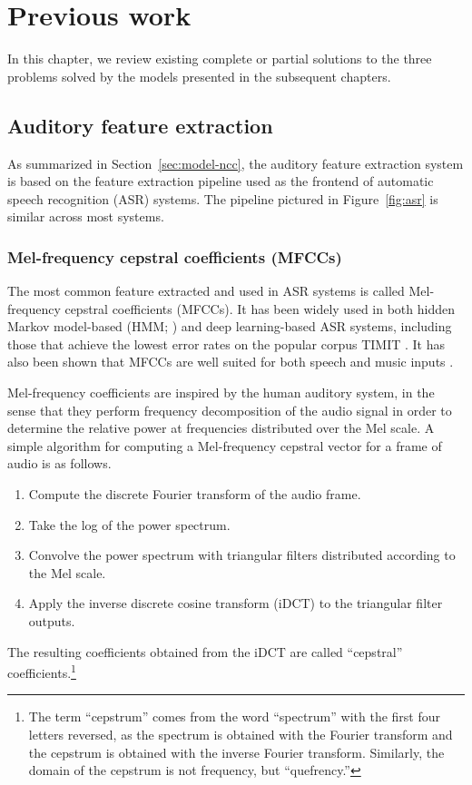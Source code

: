 \chapter{Previous work}
\label{chapt:previouswork}

In this chapter, we review
existing complete or partial solutions
to the three problems
solved by the models
presented in the subsequent chapters.

\section{Auditory feature extraction}

As summarized in Section~\ref{sec:model-ncc},
the auditory feature extraction system
is based on the feature extraction pipeline
used as the frontend
of automatic speech recognition (ASR) systems.
The pipeline pictured in Figure~\ref{fig:asr}
is similar across most systems.

\subsection{Mel-frequency cepstral coefficients (MFCCs)}
\label{sec:prev-mfcc}

The most common feature extracted
and used in ASR systems
is called Mel-frequency cepstral coefficients (MFCCs).
It has been widely used
in both hidden Markov model-based
(HMM; \citealp{hain1999,gales2008,gaikwad2010,alam2013})
and deep learning-based
\citep{graves2006,graves2008,fernandez2008} ASR systems,
including those that achieve
the lowest error rates
on the popular corpus TIMIT
\citep{garofolo1993,lopes2011}.
It has also been shown that
MFCCs are well suited
for both speech and music inputs
\citep{logan2000}.

Mel-frequency coefficients are inspired
by the human auditory system,
in the sense that they perform
frequency decomposition
of the audio signal
in order to determine the relative power
at frequencies distributed over the Mel scale.
A simple algorithm for computing a
Mel-frequency cepstral vector
for a frame of audio is as follows.

\begin{enumerate}
  \item Compute the discrete Fourier transform
    of the audio frame.
  \item Take the log of the power spectrum.
  \item Convolve the power spectrum
    with triangular filters distributed
    according to the Mel scale.
  \item Apply the inverse discrete cosine transform (iDCT)
    to the triangular filter outputs.
\end{enumerate}
The resulting coefficients obtained from
the iDCT are called ``cepstral'' coefficients.\footnote{
  The term ``cepstrum'' comes from
  the word ``spectrum'' with the first four letters reversed,
  as the spectrum is obtained with the Fourier transform
  and the cepstrum is obtained with the inverse Fourier transform.
  Similarly, the domain of the cepstrum is not frequency,
  but ``quefrency.''}

